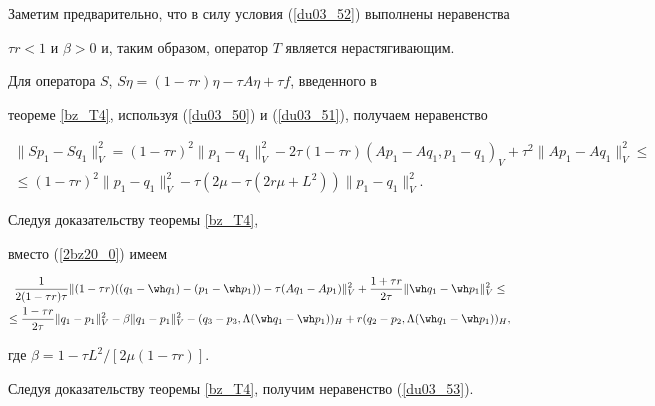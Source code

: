 \begin{pf}


Заметим предварительно, что в силу условия (\ref{du03_52}) выполнены неравенства 


$ \tau r <1 $ и $\beta >0$ и, таким образом, оператор $T$ является нерастягивающим.


Для оператора $S$, $S \eta=(1- \tau r) \eta-\tau A \eta +\tau f$, введенного в 


теореме \ref{bz_T4}, используя (\ref{du03_50}) и (\ref{du03_51}), получаем неравенство


\begin{multline*}


\| {S p_1-S q_1} \|_V^2=(1- \tau r)^2 \| {p_1-q_1} \|_V^2 -


2 \tau (1- \tau r) (A p_1-A q_1, p_1-q_1)_V+\tau^2 \| {A p_1-A q_1} \|_V^2 \leq \\


%


\leq(1- \tau r)^2 \| {p_1-q_1} \|_V^2-\tau (2\mu-\tau (2 r \mu+L^2)) \| {p_1-q_1} \|_V^2 .




\end{multline*}


Следуя доказательству теоремы \ref{bz_T4}, 


вместо (\ref{2bz20_0}) имеем


\begin{multline*}


\frac {1}{2 (1-\tau r) \tau} \| (1-\tau r) ((q_1 -\wh q_1)- (p_1- \wh p_1))


- \tau (A q_1- A p_1) \|_V^2+


\frac {1+\tau r} {2 \tau} \| {\wh q_1-\wh p_1} \|_V^2 \leq \\


%


\le \frac {1-\tau r} {2 \tau} \| {q_1-p_1} \|_V^2-


\beta \| q_1-p_1 \|_V^2-


({q_3-p_3, \Lambda (\wh q_1-\wh p_1)})_H


+ r ({q_2-p_2, \Lambda (\wh q_1-\wh p_1)})_H ,




\end{multline*}


где $\beta=1- \tau L^2 / [2 \mu (1-\tau r)] $.


Следуя доказательству теоремы \ref{bz_T4}, получим неравенство (\ref{du03_53}).


\end{pf}








